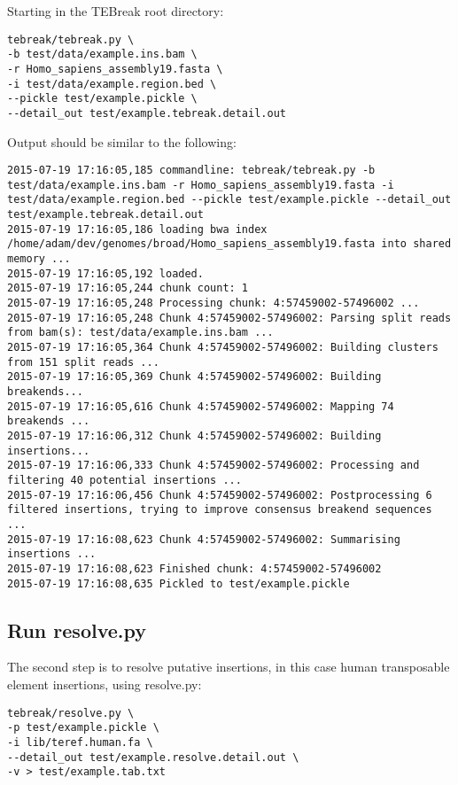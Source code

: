 \documentclass[letterpaper,11pt]{article}
\begin{document}
Starting in the TEBreak root directory:

\begin{verbatim}
tebreak/tebreak.py \
-b test/data/example.ins.bam \
-r Homo_sapiens_assembly19.fasta \
-i test/data/example.region.bed \
--pickle test/example.pickle \
--detail_out test/example.tebreak.detail.out
\end{verbatim}

Output should be similar to the following:

\begin{verbatim}
2015-07-19 17:16:05,185 commandline: tebreak/tebreak.py -b test/data/example.ins.bam -r Homo_sapiens_assembly19.fasta -i test/data/example.region.bed --pickle test/example.pickle --detail_out test/example.tebreak.detail.out
2015-07-19 17:16:05,186 loading bwa index /home/adam/dev/genomes/broad/Homo_sapiens_assembly19.fasta into shared memory ...
2015-07-19 17:16:05,192 loaded.
2015-07-19 17:16:05,244 chunk count: 1
2015-07-19 17:16:05,248 Processing chunk: 4:57459002-57496002 ...
2015-07-19 17:16:05,248 Chunk 4:57459002-57496002: Parsing split reads from bam(s): test/data/example.ins.bam ...
2015-07-19 17:16:05,364 Chunk 4:57459002-57496002: Building clusters from 151 split reads ...
2015-07-19 17:16:05,369 Chunk 4:57459002-57496002: Building breakends...
2015-07-19 17:16:05,616 Chunk 4:57459002-57496002: Mapping 74 breakends ...
2015-07-19 17:16:06,312 Chunk 4:57459002-57496002: Building insertions...
2015-07-19 17:16:06,333 Chunk 4:57459002-57496002: Processing and filtering 40 potential insertions ...
2015-07-19 17:16:06,456 Chunk 4:57459002-57496002: Postprocessing 6 filtered insertions, trying to improve consensus breakend sequences ...
2015-07-19 17:16:08,623 Chunk 4:57459002-57496002: Summarising insertions ...
2015-07-19 17:16:08,623 Finished chunk: 4:57459002-57496002
2015-07-19 17:16:08,635 Pickled to test/example.pickle
\end{verbatim}

\subsection{Run resolve.py}

The second step is to resolve putative insertions, in this case human transposable element insertions, using resolve.py:

\begin{verbatim}
tebreak/resolve.py \
-p test/example.pickle \
-i lib/teref.human.fa \
--detail_out test/example.resolve.detail.out \
-v > test/example.tab.txt
\end{verbatim}
\end{document}
